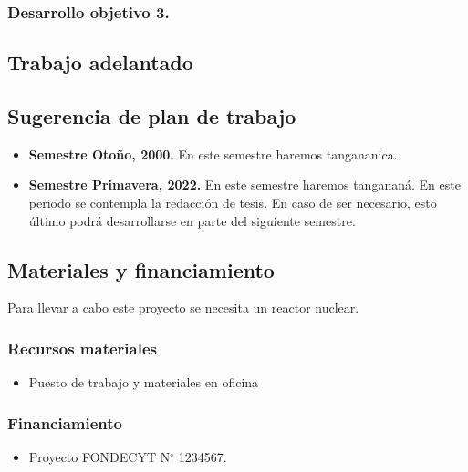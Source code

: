 \documentclass{proyectotesis}
\begin{document}
\subsubsection{Desarrollo objetivo 3.} 

\subsection{Trabajo adelantado}

\subsection{Sugerencia de plan de trabajo}
\begin{itemize}
\item \textbf{Semestre Otoño, 2000.} En este semestre haremos tangananica.

\item \textbf{Semestre Primavera, 2022.} En este semestre haremos tangananá. En este periodo se contempla la redacción de tesis. En caso de ser necesario, esto último podrá desarrollarse en parte del siguiente semestre. 
\end{itemize}

\subsection{Materiales y financiamiento}

Para llevar a cabo este proyecto se necesita un reactor nuclear. 

\subsubsection*{Recursos materiales}

\begin{itemize}
\item Puesto de trabajo y materiales en oficina
\end{itemize}

\subsubsection*{Financiamiento}
\begin{itemize}
\item Proyecto FONDECYT N$^\circ$ 1234567.
\end{itemize}

\end{document}
